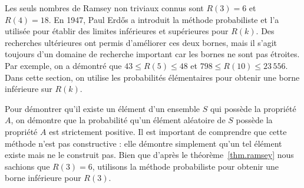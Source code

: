 Les seuls nombres de Ramsey non triviaux connus sont $R(3)=6$ et $R(4)=18$. En 1947, Paul Erd\H{o}s a introduit la méthode probabiliste et l'a utilisée pour établir des limites inférieures et supérieures pour $R(k)$. Des recherches ultérieures ont permis d'améliorer ces deux bornes, mais il s'agit toujours d'un domaine de recherche important car les bornes ne sont pas étroites. Par exemple, on a démontré que $43\leq R(5) \leq 48$ et $798\leq R(10)\leq 23\,556$. Dans cette section, on utilise les probabilités élémentaires pour obtenir une borne inférieure sur $R(k)$.

Pour démontrer qu'il existe un élément d'un ensemble $S$ qui possède la propriété $A$, on démontre que la probabilité qu'un élément aléatoire de $S$ possède la propriété $A$ est strictement positive. Il est important de comprendre que cette méthode n'est pas constructive : elle démontre simplement qu'un tel élément existe mais ne le construit pas. Bien que d'après le théorème~\ref{thm.ramsey} nous sachions que $R(3)=6$, utilisons la méthode probabiliste pour obtenir une borne inférieure pour $R(3)$.




